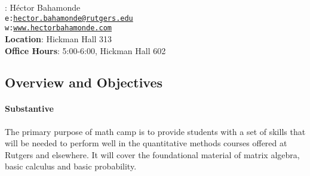 \documentclass[10pt]{article}
\begin{document}


\thispagestyle{fancy} %





\hspace{-6mm}{\bf Instructor}: H\'ector Bahamonde\\
\texttt{e:}\href{mailto:hector.bahamonde@rutgers.edu}{\texttt{hector.bahamonde@rutgers.edu}}\\
\texttt{w:}\href{http://www.hectorbahamonde.com}{\texttt{www.hectorbahamonde.com}}\\
{\bf Location}: Hickman Hall 313\\
{\bf Office Hours}: 5:00-6:00, Hickman Hall 602

\subsection*{Overview and Objectives}

\paragraph{Substantive} The primary purpose of math camp is to provide students with a set of skills that will be needed to perform well in the quantitative methods courses offered at Rutgers and elsewhere. It will cover the foundational material of matrix algebra, basic calculus and basic probability.
\end{document}
